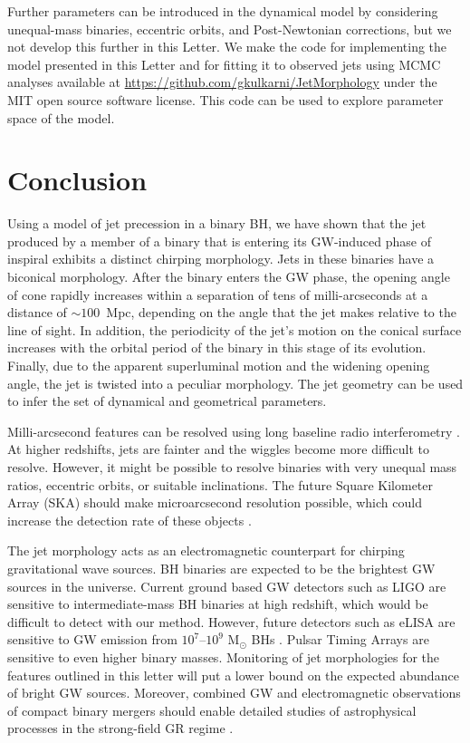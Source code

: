 \documentclass[a4paper,fleqn,usenatbib]{mnras}
\begin{document}
Further parameters can be introduced in the dynamical model by
considering unequal-mass binaries, eccentric orbits, and
Post-Newtonian corrections, but we not develop this further in this
Letter.  We make the code for implementing the model presented in this
Letter and for fitting it to observed jets using MCMC analyses
available at \url{https://github.com/gkulkarni/JetMorphology} under
the MIT open source software license.  This code can be used to
explore parameter space of the model.

\section{Conclusion}

Using a model of jet precession in a binary BH, we have shown that the
jet produced by a member of a binary that is entering its GW-induced
phase of inspiral exhibits a distinct chirping morphology.  Jets in
these binaries have a biconical morphology.  After the binary enters
the GW phase, the opening angle of cone rapidly increases within a
separation of tens of milli-arcseconds at a distance of $\sim
100$~Mpc, depending on the angle that the jet makes relative to the
line of sight.  In addition, the periodicity of the jet's motion on
the conical surface increases with the orbital period of the binary in
this stage of its evolution.  Finally, due to the apparent
superluminal motion and the widening opening angle, the jet is twisted
into a peculiar morphology.  The jet geometry can be used to infer the
set of dynamical and geometrical parameters.

Milli-arcsecond features can be resolved using long baseline radio
interferometry \citep{2001ChJAA...1..236Q}.  At higher redshifts, jets
are fainter and the wiggles become more difficult to resolve.
However, it might be possible to resolve binaries with very unequal
mass ratios, eccentric orbits, or suitable inclinations.  The future
Square Kilometer Array (SKA) should make microarcsecond resolution
possible, which could increase the detection rate of these objects
\citep{2014arXiv1412.5971P}.

The jet morphology acts as an electromagnetic counterpart for chirping
gravitational wave sources.  BH binaries are expected to be the
brightest GW sources in the universe.  Current ground based GW
detectors such as LIGO are sensitive to intermediate-mass BH binaries
at high redshift, which would be difficult to detect with our method.
However, future detectors such as eLISA are sensitive to GW emission
from $10^7$--$10^9$ M$_\odot$ BHs \citep{2013CQGra..30x4009S}.  Pulsar
Timing Arrays are sensitive to even higher binary masses.  Monitoring
of jet morphologies for the features outlined in this letter will put
a lower bound on the expected abundance of bright GW
sources. Moreover, combined GW and electromagnetic observations of
compact binary mergers should enable detailed studies of astrophysical
processes in the strong-field GR regime \citep{2005ApJ...629...15H}.
\end{document}
